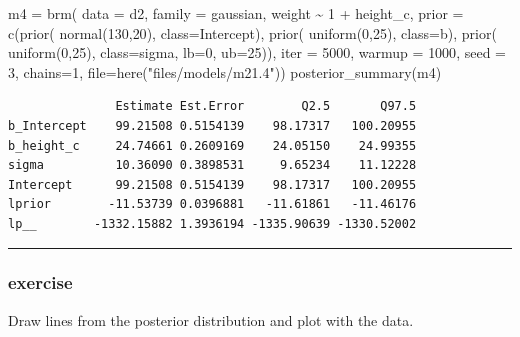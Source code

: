 \documentclass[
  letterpaper,
  DIV=11,
  numbers=noendperiod]{scrartcl}
\newenvironment{Shaded}{\begin{snugshade}}{\end{snugshade}}
\newcommand{\AttributeTok}[1]{\textcolor[rgb]{0.40,0.45,0.13}{#1}}
\newcommand{\DecValTok}[1]{\textcolor[rgb]{0.68,0.00,0.00}{#1}}
\newcommand{\FunctionTok}[1]{\textcolor[rgb]{0.28,0.35,0.67}{#1}}
\newcommand{\NormalTok}[1]{\textcolor[rgb]{0.00,0.23,0.31}{#1}}
\newcommand{\OtherTok}[1]{\textcolor[rgb]{0.00,0.23,0.31}{#1}}
\newcommand{\SpecialCharTok}[1]{\textcolor[rgb]{0.37,0.37,0.37}{#1}}
\newcommand{\StringTok}[1]{\textcolor[rgb]{0.13,0.47,0.30}{#1}}
\begin{document}
\begin{Shaded}
\begin{Highlighting}[]
\NormalTok{m4 }\OtherTok{=} \FunctionTok{brm}\NormalTok{(}
  \AttributeTok{data =}\NormalTok{ d2,}
  \AttributeTok{family =}\NormalTok{ gaussian,}
\NormalTok{  weight }\SpecialCharTok{\textasciitilde{}} \DecValTok{1} \SpecialCharTok{+}\NormalTok{ height\_c,}
  \AttributeTok{prior =} \FunctionTok{c}\NormalTok{(}\FunctionTok{prior}\NormalTok{( }\FunctionTok{normal}\NormalTok{(}\DecValTok{130}\NormalTok{,}\DecValTok{20}\NormalTok{), }\AttributeTok{class=}\NormalTok{Intercept),}
            \FunctionTok{prior}\NormalTok{( }\FunctionTok{uniform}\NormalTok{(}\DecValTok{0}\NormalTok{,}\DecValTok{25}\NormalTok{),   }\AttributeTok{class=}\NormalTok{b),}
            \FunctionTok{prior}\NormalTok{( }\FunctionTok{uniform}\NormalTok{(}\DecValTok{0}\NormalTok{,}\DecValTok{25}\NormalTok{),  }\AttributeTok{class=}\NormalTok{sigma, }\AttributeTok{lb=}\DecValTok{0}\NormalTok{, }\AttributeTok{ub=}\DecValTok{25}\NormalTok{)),  }
      \AttributeTok{iter =} \DecValTok{5000}\NormalTok{, }\AttributeTok{warmup =} \DecValTok{1000}\NormalTok{, }\AttributeTok{seed =} \DecValTok{3}\NormalTok{, }\AttributeTok{chains=}\DecValTok{1}\NormalTok{,}
  \AttributeTok{file=}\FunctionTok{here}\NormalTok{(}\StringTok{"files/models/m21.4"}\NormalTok{))}
\FunctionTok{posterior\_summary}\NormalTok{(m4)}
\end{Highlighting}
\end{Shaded}

\begin{verbatim}
               Estimate Est.Error        Q2.5       Q97.5
b_Intercept    99.21508 0.5154139    98.17317   100.20955
b_height_c     24.74661 0.2609169    24.05150    24.99355
sigma          10.36090 0.3898531     9.65234    11.12228
Intercept      99.21508 0.5154139    98.17317   100.20955
lprior        -11.53739 0.0396881   -11.61861   -11.46176
lp__        -1332.15882 1.3936194 -1335.90639 -1330.52002
\end{verbatim}

\begin{center}\rule{0.5\linewidth}{0.5pt}\end{center}

\subsubsection{exercise}\label{exercise-5}

Draw lines from the posterior distribution and plot with the data.
\end{document}
